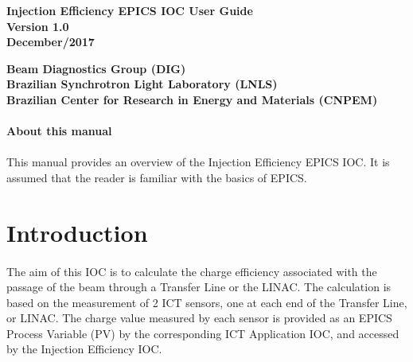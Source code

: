 \documentclass[openany]{article}
\begin{document}
\begin{titlepage}

\thispagestyle{fancy}

\begin{center}

\vspace*{\fill}
\textbf{\Huge Injection Efficiency EPICS IOC User Guide}\\[20pt]
\textbf{\Huge Version 1.0}\\[20pt]
\textbf{\Huge December/2017}
\vspace*{\fill}

\vfill
\textbf{Beam Diagnostics Group (DIG)}\\[5pt]
\textbf{Brazilian Synchrotron Light Laboratory (LNLS)}\\[5pt]
\textbf{Brazilian Center for Research in Energy and Materials (CNPEM)}
\end{center}

\end{titlepage}

\newpage
\pagestyle{plain} %

\paragraph{}{\Large\bfseries About this manual}

\paragraph{} This manual provides an overview of the Injection Efficiency EPICS IOC. It is assumed that the reader is familiar with the basics of EPICS.

\tableofcontents

\newpage
\section{Introduction}

\paragraph{} The aim of this IOC is to calculate the charge efficiency associated with the passage of the beam through a Transfer Line or the LINAC. The calculation is based on the measurement of 2 ICT sensors, one at each end of the Transfer Line, or LINAC. The charge value measured by each sensor is provided as an EPICS Process Variable (PV) by the corresponding ICT Application IOC, and accessed by the Injection Efficiency IOC.
\end{document}
